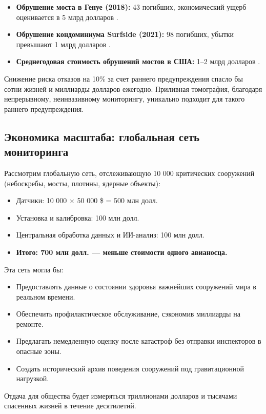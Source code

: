 \documentclass[12pt,a4paper]{article}
\theoremstyle{remark}
\begin{document}
	\begin{itemize}
		\item \textbf{Обрушение моста в Генуе (2018):} 43 погибших, экономический ущерб оценивается в 5 млрд долларов \cite{Genoa2018}.
		\item \textbf{Обрушение кондоминиума Surfside (2021):} 98 погибших, убытки превышают 1 млрд долларов \cite{Surfside2021}.
		\item \textbf{Среднегодовая стоимость обрушений мостов в США:} 1–2 млрд долларов \cite{ASCE2021}.
	\end{itemize}
	
	Снижение риска отказов на 10\% за счет раннего предупреждения спасло бы сотни жизней и миллиарды долларов ежегодно. Приливная томография, благодаря непрерывному, неинвазивному мониторингу, уникально подходит для такого раннего предупреждения.
	
	\subsection{Экономика масштаба: глобальная сеть мониторинга}
	
	Рассмотрим глобальную сеть, отслеживающую 10 000 критических сооружений (небоскребы, мосты, плотины, ядерные объекты):
	
	\begin{itemize}
		\item Датчики: 10 000 × 50 000 \$ = 500 млн долл.
		\item Установка и калибровка: 100 млн долл.
		\item Центральная обработка данных и ИИ-анализ: 100 млн долл.
		\item \textbf{Итого: 700 млн долл. — меньше стоимости одного авианосца.}
	\end{itemize}
	
	Эта сеть могла бы:
	\begin{itemize}
		\item Предоставлять данные о состоянии здоровья важнейших сооружений мира в реальном времени.
		\item Обеспечить профилактическое обслуживание, сэкономив миллиарды на ремонте.
		\item Предлагать немедленную оценку после катастроф без отправки инспекторов в опасные зоны.
		\item Создать исторический архив поведения сооружений под гравитационной нагрузкой.
	\end{itemize}
	
	Отдача для общества будет измеряться триллионами долларов и тысячами спасенных жизней в течение десятилетий.
	
\end{document}
